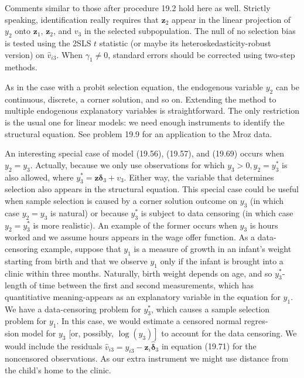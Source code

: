 \documentclass[10pt]{article}
\begin{document}
Comments similar to those after procedure 19.2 hold here as well. Strictly speaking, identification really requires that $\mathbf{z}_{2}$ appear in the linear projection of $y_{2}$ onto $\mathbf{z}_{1}$, $\mathbf{z}_{2}$, and $v_{3}$ in the selected subpopulation. The null of no selection bias is tested using the 2SLS $t$ statistic (or maybe its heteroskedasticity-robust version) on $\hat{v}_{i 3}$. When $\gamma_{1} \neq 0$, standard errors should be corrected using two-step methods.

As in the case with a probit selection equation, the endogenous variable $y_{2}$ can be continuous, discrete, a corner solution, and so on. Extending the method to multiple endogenous explanatory variables is straightforward. The only restriction is the usual one for linear models: we need enough instruments to identify the structural equation. See problem 19.9 for an application to the Mroz data.

An interesting special case of model (19.56), (19.57), and (19.69) occurs when $y_{2}=y_{3}$. Actually, because we only use observations for which $y_{3}>0, y_{2}=y_{3}^{*}$ is also allowed, where $y_{3}^{*}=\mathbf{z} \boldsymbol{\delta}_{3}+v_{3}$. Either way, the variable that determines selection also appears in the structural equation. This special case could be useful when sample selection is caused by a corner solution outcome on $y_{3}$ (in which case $y_{2}=y_{3}$ is natural) or because $y_{3}^{*}$ is subject to data censoring (in which case $y_{2}=y_{3}^{*}$ is more realistic). An example of the former occurs when $y_{3}$ is hours worked and we assume hours appears in the wage offer function. As a data-censoring example, suppose that $y_{1}$ is a measure of growth in an infant's weight starting from birth and that we observe $y_{1}$ only if the infant is brought into a clinic within three months. Naturally, birth weight depends on age, and so $y_{3}^{*}$-length of time between the first and second measurements, which has quantitiative meaning-appears as an explanatory variable in the equation for $y_{1}$. We have a data-censoring problem for $y_{3}^{*}$, which causes a sample selection problem for $y_{1}$. In this case, we would estimate a censored normal regres-\\
sion model for $y_{3}$ [or, possibly, $\left.\log \left(y_{3}\right)\right]$ to account for the data censoring. We would include the residuals $\hat{v}_{i 3}=y_{i 3}-\mathbf{z}_{i} \hat{\boldsymbol{\delta}}_{3}$ in equation (19.71) for the noncensored observations. As our extra instrument we might use distance from the child's home to the clinic.
\end{document}
